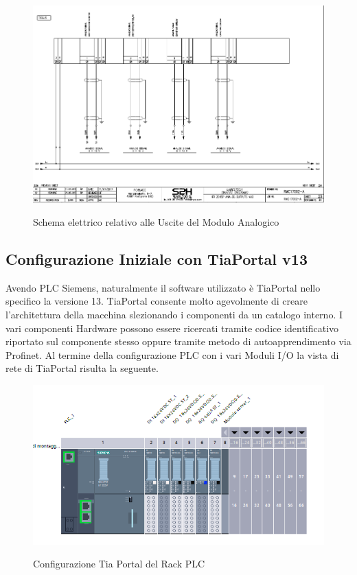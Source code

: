 \documentclass[12pt, a4paper, oneside]{book}
\begin{document}
\begin{figure}[H]
	\centering
	\includegraphics[width=12cm]{Immagini/SCELE3}
	\label{scele3}
	\caption{Schema elettrico relativo alle Uscite del Modulo Analogico }
\end{figure}

\subsection{Configurazione Iniziale con TiaPortal v13}
	Avendo PLC Siemens, naturalmente il software utilizzato è TiaPortal nello specifico la versione 13.
	TiaPortal consente molto agevolmente di creare l'architettura della macchina slezionando i componenti da un catalogo interno. I vari componenti Hardware possono essere ricercati tramite codice identificativo riportato sul componente stesso oppure tramite metodo di autoapprendimento via Profinet. Al termine della configurazione PLC con i vari Moduli I/O la vista di rete di TiaPortal risulta la seguente.
	
	\begin{figure}[H]
		\centering
		\includegraphics[width=12cm]{Immagini/TIA0}
		\label{tia0}
		\caption{Configurazione Tia Portal del Rack PLC}
	\end{figure}
\end{document}
